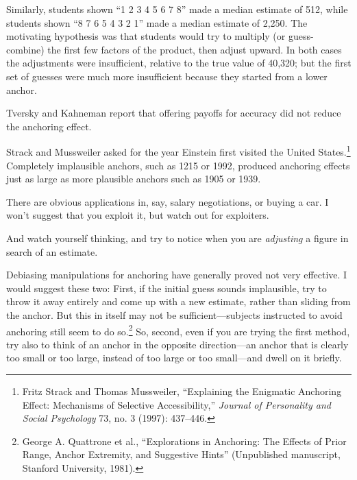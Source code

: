 {
 Similarly, students shown ``1 {\texttimes} 2
{\texttimes} 3 {\texttimes} 4 {\texttimes} 5 {\texttimes} 6
{\texttimes} 7 {\texttimes} 8'' made a median
estimate of 512, while students shown ``8 {\texttimes}
7 {\texttimes} 6 {\texttimes} 5 {\texttimes} 4 {\texttimes} 3
{\texttimes} 2 {\texttimes} 1'' made a median
estimate of 2,250. The motivating hypothesis was that students would
try to multiply (or guess-combine) the first few factors of the
product, then adjust upward. In both cases the adjustments were
insufficient, relative to the true value of 40,320; but the first set
of guesses were much more insufficient because they started from a
lower anchor.}

{
 Tversky and Kahneman report that offering payoffs for accuracy did
not reduce the anchoring effect.}

{
 Strack and Mussweiler asked for the year Einstein first visited
the United States.\footnote{Fritz Strack and Thomas Mussweiler,
``Explaining the Enigmatic Anchoring Effect:
Mechanisms of Selective Accessibility,''
\textit{Journal of Personality and Social Psychology} 73, no. 3 (1997):
437--446.} Completely implausible anchors,
such as 1215 or 1992, produced anchoring effects just as large as more
plausible anchors such as 1905 or 1939.}

{
 There are obvious applications in, say, salary negotiations, or
buying a car. I won't suggest that you exploit it, but
watch out for exploiters.}

{
 And watch yourself thinking, and try to notice when you are
\textit{adjusting} a figure in search of an estimate.}

{
 Debiasing manipulations for anchoring have generally proved not
very effective. I would suggest these two: First, if the initial guess
sounds implausible, try to throw it away entirely and come up with a
new estimate, rather than sliding from the anchor. But this in itself
may not be sufficient---subjects instructed to avoid anchoring still
seem to do so.\footnote{George A. Quattrone et al., ``Explorations in
Anchoring: The Effects of Prior Range, Anchor Extremity, and Suggestive
Hints'' (Unpublished manuscript, Stanford University,
1981).} So, second, even if you are trying
the first method, try also to think of an anchor in the opposite
direction---an anchor that is clearly too small or too large, instead
of too large or too small---and dwell on it briefly.}

\myendsectiontext


\bigskip

